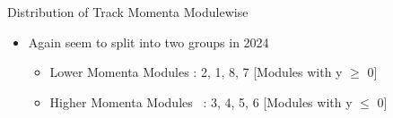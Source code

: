 \begin{frame}{Distribution of Track Momenta Modulewise}
    \begin{itemize}
        \small
        \item Again seem to split into two groups in 2024
        \begin{itemize}
            \item Lower Momenta Modules : 2, 1, 8, 7 [Modules with y $\geq$ 0]
            \item Higher Momenta Modules \ : 3, 4, 5, 6  [Modules with y $\leq$ 0]
        \end{itemize}
    \end{itemize}
\end{frame}